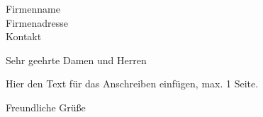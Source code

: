 \documentclass[
parskip=half,
fontsize=11pt, %
twoside=off, %
version=last,
foldmarks=false,
fromalign=center, %
fromrule=true,
frommobilephone,
fromemail,
subject=titled,
backaddress=false,
draft=true, %
firstfoot=false, %
final=false, %
]    
{scrlttr2}
\newcommand{\address}{
Firmenname    \\
Firmenadresse \\
Kontakt       \\
}
\begin{document}
\begin{letter}{\address}
	\opening{Sehr geehrte Damen und Herren}

	Hier den Text für das Anschreiben einfügen, max. 1 Seite.
	\closing{Freundliche Grüße}


\end{letter}
\end{document}
